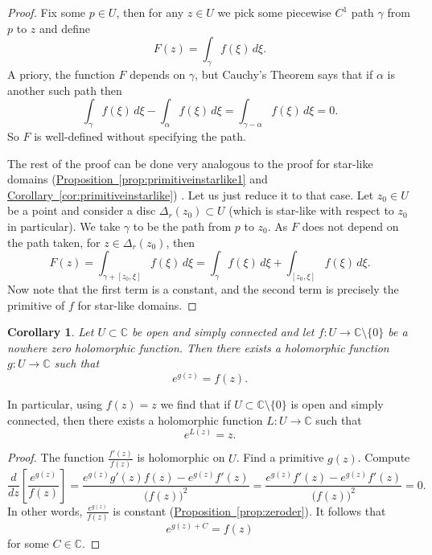\documentclass[12pt,openany]{book}
\newcommand{\C}{{\mathbb{C}}}
\theoremstyle{plain}
\newtheorem{cor}[thm]{Corollary}
\theoremstyle{remark}
\theoremstyle{definition}
\theoremstyle{exercise}
\theoremstyle{example}
\newcommand{\propref}[1]{\hyperref[#1]{Proposition~\ref*{#1}}}
\newcommand{\corref}[1]{\hyperref[#1]{Corollary~\ref*{#1}}}
\begin{document}
\begin{proof}
Fix some $p \in U$, then for any $z \in U$ we pick
some piecewise $C^1$ path $\gamma$ from $p$ to $z$
and define
\begin{equation*}
F(z) = \int_\gamma f(\xi) \, d\xi .
\end{equation*}
A priory, the function $F$ depends on $\gamma$, but Cauchy's
Theorem says that if $\alpha$ is another such path then
\begin{equation*}
\int_\gamma f(\xi) \, d\xi -
\int_\alpha f(\xi) \, d\xi 
=
\int_{\gamma-\alpha} f(\xi) \, d\xi  =  0 .
\end{equation*}
So $F$ is well-defined without specifying the path.

The rest of the proof can be done very analogous to the proof for star-like
domains (\propref{prop:primitiveinstarlike1} and
\corref{cor:primitiveinstarlike}) .  Let us just reduce it to that case.
Let $z_0 \in U$ be a point and consider a disc $\Delta_r(z_0) \subset U$
(which is star-like with respect to $z_0$ in particular).
We take $\gamma$ to be the path from $p$ to $z_0$.
As $F$ does not depend on the path taken, for $z \in \Delta_r(z_0)$,
then
\begin{equation*}
F(z) =
\int_{\gamma+[z_0,\xi]} f(\xi) \, d\xi
=
\int_{\gamma} f(\xi) \, d\xi
+
\int_{[z_0,\xi]} f(\xi) \, d\xi .
\end{equation*}
Now note that the first term is a constant, and the second term is precisely
the primitive of $f$ for star-like domains.
\end{proof}

\begin{cor}
Let $U \subset \C$ be open and simply connected and
let $f \colon U \to \C \setminus \{ 0 \}$ be a nowhere zero holomorphic
function.  Then there exists a holomorphic function $g \colon U \to \C$
such that
\begin{equation*}
e^{g(z)} = f(z) .
\end{equation*}
\end{cor}

In particular, using $f(z) = z$ we find that if
$U \subset \C \setminus \{ 0 \}$ is open and simply connected, then
there exists a holomorphic function $L \colon U \to \C$ such that
\begin{equation*}
e^{L(z)} = z .
\end{equation*}

\begin{proof}
The function $\frac{f'(z)}{f(z)}$ is holomorphic on $U$.
Find a primitive $g(z)$.  Compute
\begin{equation*}
\frac{d}{dz} \left[ \frac{e^{g(z)}}{f(z)} \right] =
\frac{ e^{g(z)} g'(z) f(z) - e^{g(z)} f'(z) }{{\bigl(f(z)\bigr)}^2}
=
\frac{ e^{g(z)} f'(z) - e^{g(z)} f'(z) }{{\bigl(f(z)\bigr)}^2}
=
0 .
\end{equation*}
In other words, $\frac{e^{g(z)}}{f(z)}$ is constant
(\propref{prop:zeroder}).  It follows that
\begin{equation*}
e^{g(z) + C} = f(z)
\end{equation*}
for some $C \in \C$.
\end{proof}
\end{document}
